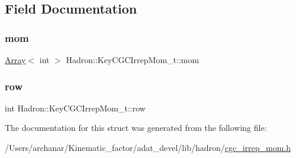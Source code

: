 \subsection{Field Documentation}
\mbox{\label{structHadron_1_1KeyCGCIrrepMom__t_ac6136fa6ead6307922ff19950cacb083}} 
\subsubsection{\texorpdfstring{mom}{mom}}
{\footnotesize\ttfamily \mbox{\hyperlink{classXMLArray_1_1Array}{Array}}$<$ int $>$ Hadron\+::\+Key\+C\+G\+C\+Irrep\+Mom\+\_\+t\+::mom}

\mbox{\label{structHadron_1_1KeyCGCIrrepMom__t_a3e57507b9b7e870a9def2e18f4507875}} 
\subsubsection{\texorpdfstring{row}{row}}
{\footnotesize\ttfamily int Hadron\+::\+Key\+C\+G\+C\+Irrep\+Mom\+\_\+t\+::row}



The documentation for this struct was generated from the following file\+:\begin{DoxyCompactItemize}
\item 
/\+Users/archanar/\+Kinematic\+\_\+factor/adat\+\_\+devel/lib/hadron/\mbox{\hyperlink{lib_2hadron_2cgc__irrep__mom_8h}{cgc\+\_\+irrep\+\_\+mom.\+h}}\end{DoxyCompactItemize}
